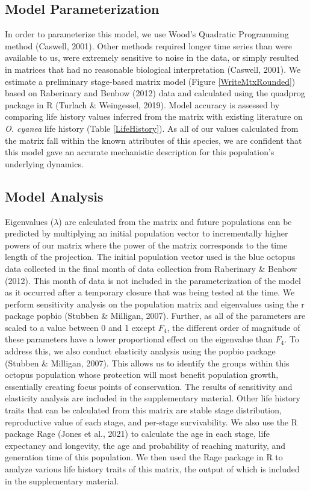 \documentclass[
]{article}
\begin{document}
\hypertarget{model-parameterization}{%
\subsection{Model Parameterization}\label{model-parameterization}}

In order to parameterize this model, we use Wood's Quadratic Programming method (Caswell, 2001). Other methods required longer time series than were available to us, were extremely sensitive to noise in the data, or simply resulted in matrices that had no reasonable biological interpretation (Caswell, 2001). We estimate a preliminary stage-based matrix model (Figure \ref{WriteMtxRounded}) based on Raberinary and Benbow (2012) data and calculated using the quadprog package in R (Turlach \& Weingessel, 2019). Model accuracy is assessed by comparing life history values inferred from the matrix with existing literature on \emph{O. cyanea} life history (Table \ref{LifeHistory}). As all of our values calculated from the matrix fall within the known attributes of this species, we are confident that this model gave an accurate mechanistic description for this population's underlying dynamics.

\hypertarget{model-analysis}{%
\subsection{Model Analysis}\label{model-analysis}}

Eigenvalues (\(\lambda\)) are calculated from the matrix and future populations can be predicted by multiplying an initial population vector to incrementally higher powers of our matrix where the power of the matrix corresponds to the time length of the projection. The initial population vector used is the blue octopus data collected in the final month of data collection from Raberinary \& Benbow (2012). This month of data is not included in the parameterization of the model as it occurred after a temporary closure that was being tested at the time. We perform sensitivity analysis on the population matrix and eigenvalues using the r package popbio (Stubben \& Milligan, 2007). Further, as all of the parameters are scaled to a value between 0 and 1 except \(F_4\), the different order of magnitude of these parameters have a lower proportional effect on the eigenvalue than \(F_4\). To address this, we also conduct elasticity analysis using the popbio package (Stubben \& Milligan, 2007). This allows us to identify the groups within this octopus population whose protection will most benefit population growth, essentially creating focus points of conservation. The results of sensitivity and elasticity analysis are included in the supplementary material. Other life history traits that can be calculated from this matrix are stable stage distribution, reproductive value of each stage, and per-stage survivability. We also use the R package Rage (Jones et al., 2021) to calculate the age in each stage, life expectancy and longevity, the age and probability of reaching maturity, and generation time of this population. We then used the Rage package in R to analyze various life history traits of this matrix, the output of which is included in the supplementary material.
\end{document}
